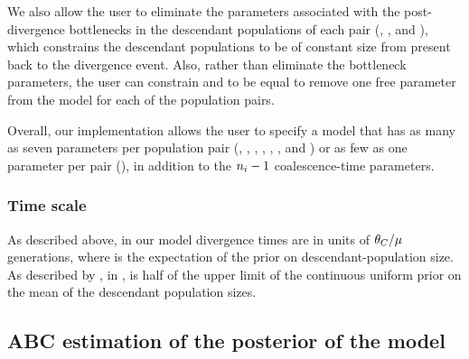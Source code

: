 \documentclass[letterpaper,12pt]{article}
\begin{document}
\begin{linenumbers}
We also allow the user to eliminate the parameters associated with
the post-divergence bottlenecks in the descendant populations of
each pair
(\bottleTime{}, , and ),
which constrains the descendant populations to be of
constant size from present back to the divergence event.
Also, rather than eliminate the bottleneck parameters, the user
can constrain  and  to be
equal to remove one free parameter from the model for each of
the population pairs.

Overall, our implementation allows the user to specify a model that has as many
as seven parameters per population pair
(\ancestralTheta{}, , ,
\bottleTime{}, , , and
\migrationRate{})
or as few as one parameter per pair
(\myTheta{}),
in addition to the $\popSampleSize{i}{} - 1$ coalescence-time parameters.

\subsubsection*{Time scale}
As described above, in our model divergence times are in units of
$\theta_{C}/\mu$ generations, where  is the expectation
of the prior on descendant-population size.
As described by \citet{Oaks2012}, in \msb,  is half of the upper
limit of the continuous uniform prior on the mean of the descendant population
sizes.

\subsection*{ABC estimation of the posterior of the model}

\end{linenumbers}
\end{document}
